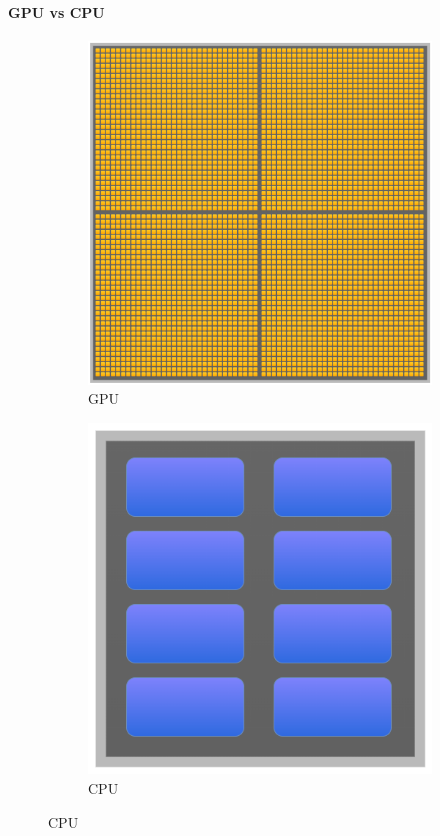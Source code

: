 \begin{frame}{\insertsectionhead}
\framesubtitle{GPU vs CPU}

\begin{figure}[ht!]
\hspace{\fill}
\begin{subfigure}[b]{0.3\textwidth}
  \includegraphics[width=\textwidth]{screenshots/GPU.drawio.png}
  \caption*{GPU}
\end{subfigure}
\hspace{\fill}
\begin{subfigure}[b]{0.3\textwidth}
  \includegraphics[width=\textwidth]{screenshots/CPU.drawio.png}
  \caption*{CPU}
\end{subfigure}
\hspace{\fill}
\end{figure}


\end{frame}
